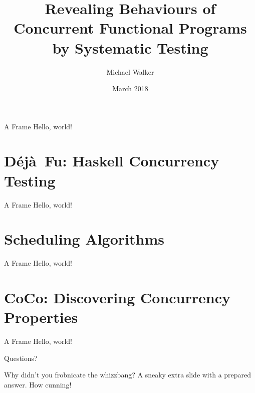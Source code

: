 \documentclass{beamer}
\title{Revealing Behaviours of Concurrent Functional Programs by Systematic Testing}
\date{March 2018}
\author{Michael Walker}
\newcommand{\dejafu}{D\'{e}j\`{a}~Fu}
\begin{document}
\maketitle

\begin{frame}{A Frame}
  Hello, world!
\end{frame}

\section{\dejafu{}: Haskell Concurrency Testing}

\begin{frame}{A Frame}
  Hello, world!
\end{frame}

\section{Scheduling Algorithms}

\begin{frame}{A Frame}
  Hello, world!
\end{frame}

\section{CoCo: Discovering Concurrency Properties}

\begin{frame}{A Frame}
  Hello, world!
\end{frame}

\begin{frame}[standout]
  Questions?
\end{frame}

\appendix

\begin{frame}{Why didn't you frobnicate the whizzbang?}
  A sneaky extra slide with a prepared answer.  How cunning!
\end{frame}
\end{document}
